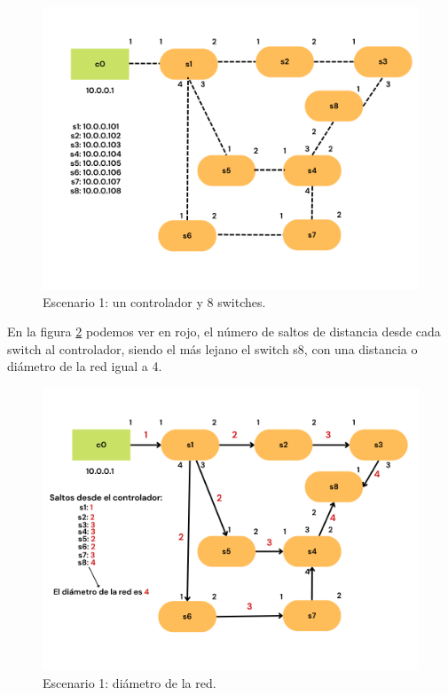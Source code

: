 \documentclass[a4paper, 12pt]{book}
\begin{document}
 	\vspace*{-18pt}
 	\begin{figure}[H]
 		\centering
 		\includegraphics[width=16cm, keepaspectratio]{img/escenario1-1}
 		\caption{Escenario 1: un controlador y 8 switches.}
 		\label{figura:escenario1-1c}
 	\end{figure}
 	
 	En la figura \ref{figura:escenario1-explicado} podemos ver en rojo, el número de saltos de distancia desde cada switch al controlador, siendo el más lejano el switch s8, con una distancia o diámetro de la red igual a 4.
 	\begin{figure}[H]
 		\centering
 		\includegraphics[width=12cm, keepaspectratio]{img/escenario1-explicado}
 		\caption{Escenario 1: diámetro de la red.}
 		\label{figura:escenario1-explicado}
 		\vspace{-18pt}
 	\end{figure}
 	
\end{document}
